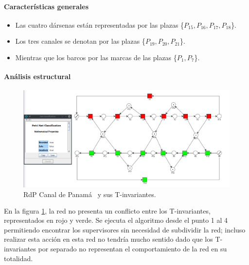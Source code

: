 \paragraph{Características generales}
\begin{itemize}
    \item Las cuatro dársenas están representadas por las plazas \{$P_{15}, P_{16}, P_{17}, P_{18}$\}.
    \item Los tres canales se denotan por las plazas \{$P_{19}, P_{20}, P_{21}$\}.
    \item Mientras que los barcos por las marcas de las plazas \{$P_1, P_7$\}.
\end{itemize}

\newpage
\paragraph{Análisis estructural}
\hfill
\begin{figure}[H]
	\centering
    \includegraphics[scale = 0.41]{Figures/algoritmo3/Panama1.png}
    \caption[RdP Canal de Panamá y sus T-invariantes.]{RdP Canal de Panamá \footnotemark \ y sus T-invariantes.}
	\label{fig:panamaytinvariantes}
 \end{figure} 
 
\hfill \par En la figura \ref{fig:panamaytinvariantes}, la red no presenta un conflicto entre los T-invariantes, representados en rojo y verde. Se ejecuta el algoritmo desde el punto 1 al 4 permitiendo encontrar los supervisores sin necesidad de subdividir la red; incluso realizar esta acción en esta red no tendría mucho sentido dado que los T-invariantes por separado no representan el comportamiento de la red en su totalidad.

